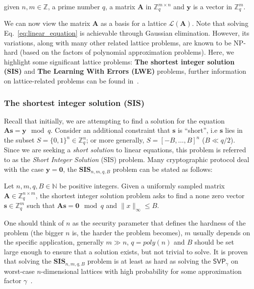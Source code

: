 \documentclass[cryptography,review,submit,pdftex,moreauthors,amsmath,amssymb,aps,strict]{Definitions/mdpi}
\begin{document}
given $n,m \in \mathbb{Z}$, a prime number $q$, a matrix $\mathbf{A}$ in $\mathbb{Z}^{m\times n}_q$ and $\mathbf{y}$ is a vector in $\mathbb{Z}^m_q$. 

We can now view the matrix $\mathbf{A}$ as a basis for a lattice $\mathcal{L}(\mathbf{A})$. Note that solving Eq.~\eqref{eq:linear_equation} is achievable through Gaussian elimination. However, its variations, along with many other related lattice problems, are known to be NP-hard (based on the factors of polynomial approximation problems). Here, we highlight some significant lattice problems: \textbf{The shortest integer solution (SIS)} and \textbf{The Learning With Errors (LWE)} problems, further information on lattice-related problems can be found in~\cite{Pei16}.

\subsubsection{The shortest integer solution (SIS)}

Recall that initially, we are attempting to find a solution for the equation $\mathbf{A}\mathbf{s} = \mathbf{y} \mod q$. Consider an additional constraint that $\mathbf{s}$ is ``short'', i.e $\mathbf{s}$ lies in the subset $S=\{0,1\}^n\in\mathbb{Z}^n_q$; or more generally, $S=[-B,\dots, B]^n$  ($B\ll q/2$). Since we are seeking a \textit{short solution} to linear equations, this problem is referred to as the \textit{Short Integer Solution} (SIS) problem. Many cryptographic protocol deal with the case $\mathbf{y}=\mathbf{0}$, the $\mathbf{SIS}_{n,m,q,B}$ problem can be stated as follows:

\begin{Definition}
    Let $n,m,q, B \in \mathbb{N}$ be positive integers. Given a uniformly sampled matrix $\mathbf{A}\in\mathbb{Z}^{n\times m}_q$, the shortest integer solution problem asks to find a none zero vector $\mathbf{s}\in\mathbb{Z}^m_q$ such that $\mathbf{A}\mathbf{s}=\mathbf{0}\mod q$ and $\|x\|_{\infty}\leq B$.
\end{Definition}

One should think of $n$ as the security parameter that defines the hardness of the problem (the bigger $n$ is, the harder the problem becomes), $m$ usually depends on the specific application, generally $m\gg n$, $q=poly(n)$ and $B$ should be set large enough to ensure that a solution exists, but not trivial to solve. It is proven that solving the $\mathbf{SIS}_{n,m,q, B}$ problem is at least as hard as solving the $\mathsf{SVP}_{\gamma}$ on worst-case $n$-dimensional lattices with high probability for some approximation factor $\gamma$~\cite{Pei16}.
\end{document}
